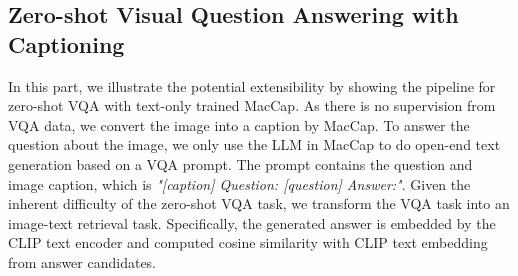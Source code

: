 \subsection{Zero-shot Visual Question Answering with Captioning}
In this part, we illustrate the potential extensibility by showing the pipeline for zero-shot VQA with text-only trained MacCap. As there is no supervision from VQA data, we convert the image into a caption by MacCap. To answer the question about the image, we only use the LLM in MacCap to do open-end text generation based on a VQA prompt. The prompt contains the question and image caption, which is \textit{"[caption] Question: [question] Answer:"}. Given the inherent difficulty of the zero-shot VQA task, we transform the VQA task into an image-text retrieval task. Specifically, the generated answer is embedded by the CLIP text encoder and computed cosine similarity with CLIP text embedding from answer candidates.
